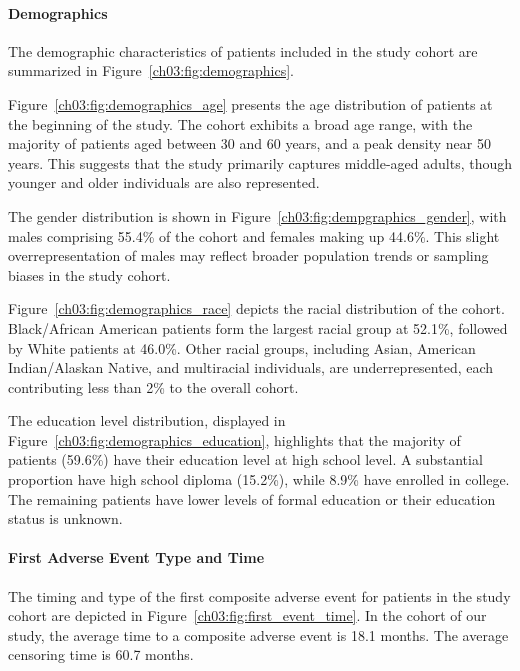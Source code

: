 \paragraph{Demographics}
\label{ch03:apd:cohort_demographics}





The demographic characteristics of patients included in the study cohort are summarized in Figure~\ref{ch03:fig:demographics}.
 
Figure~\ref{ch03:fig:demographics_age} presents the age distribution of patients at the beginning of the study.
The cohort exhibits a broad age range, with the majority of patients aged between 30 and 60 years, and a peak density near 50 years.
This suggests that the study primarily captures middle-aged adults, though younger and older individuals are also represented.
 
The gender distribution is shown in Figure~\ref{ch03:fig:dempgraphics_gender}, with males comprising 55.4\% of the cohort and females making up 44.6\%.
This slight overrepresentation of males may reflect broader population trends or sampling biases in the study cohort.
 
Figure~\ref{ch03:fig:demographics_race} depicts the racial distribution of the cohort.
Black/African American patients form the largest racial group at 52.1\%, followed by White patients at 46.0\%.
Other racial groups, including Asian, American Indian/Alaskan Native, and multiracial individuals, are underrepresented, each contributing less than 2\% to the overall cohort.
 
The education level distribution, displayed in Figure~\ref{ch03:fig:demographics_education}, highlights that the majority of patients (59.6\%) have their education level at high school level.
A substantial proportion have high school diploma (15.2\%), while 8.9\% have enrolled in college.
The remaining patients have lower levels of formal education or their education status is unknown.

\paragraph{First Adverse Event Type and Time}
\label{ch03:apd:cohort_first_event}

The timing and type of the first composite adverse event for patients in the study cohort are depicted in Figure~\ref{ch03:fig:first_event_time}. 
In the cohort of our study, the average time to a composite adverse event is 18.1 months. 
The average censoring time is 60.7 months.

